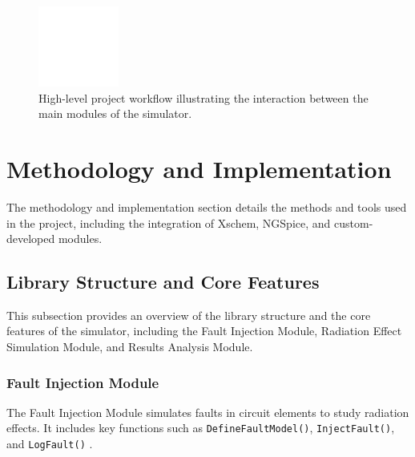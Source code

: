 \documentclass[conference]{IEEEtran}
\begin{document}
\begin{figure}[htbp]
\centering
\includegraphics[width=0.8\linewidth]{project_flow_diagram_placeholder.png}
\caption{High-level project workflow illustrating the interaction between the main modules of the simulator.}
\label{fig:project_flow}
\end{figure}

\section{Methodology and Implementation}
The methodology and implementation section details the methods and tools used in the project, including the integration of Xschem, NGSpice, and custom-developed modules.

\subsection{Library Structure and Core Features}
This subsection provides an overview of the library structure and the core features of the simulator, including the Fault Injection Module, Radiation Effect Simulation Module, and Results Analysis Module.

\subsubsection{Fault Injection Module}
The Fault Injection Module simulates faults in circuit elements to study radiation effects. It includes key functions such as \texttt{DefineFaultModel()}, \texttt{InjectFault()}, and \texttt{LogFault()} \cite{Pepper1990}.
\end{document}
